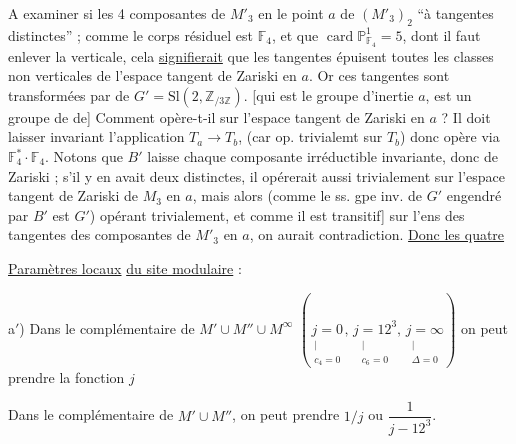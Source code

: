 A examiner si les  4 composantes de $M'_3$ en le point $a$ de $(M'_3)_2$  ``à tangentes distinctes'' ; comme le corps résiduel est $\mathbb F_4$, et que $\operatorname{card}\mathbb P^1_{\mathbb F_4}=5$, dont il faut enlever la verticale, cela \uline{signifierait} que les tangentes épuisent toutes les classes non verticales de l'espace tangent de Zariski en $a$. Or ces tangentes sont transformées  par  de $G'=\mathrm{Sl}(2,\mathbb Z_{/3\mathbb Z})$. [qui est le  groupe d'inertie  $a$, est un groupe de   de]  Comment opère-t-il sur l'espace tangent de Zariski  en $a$ ?  Il doit laisser invariant l'application $T_a\to T_b$,  (car op. trivialemt sur $T_b$) donc opère via $\mathbb F_4^*\cdot\mathbb F_4$.
Notons que $B'$  laisse chaque composante irréductible invariante, donc     de Zariski ;  s'il y en avait deux distinctes, il opérerait aussi trivialement sur l'espace tangent de Zariski de $M_3$ en $a$, mais alors (comme le ss. gpe inv. de $G'$ engendré par $B'$ est $G'$)   opérant trivialement, et comme il est transitif] sur l'ens des tangentes des composantes de $M'_3$ en $a$, on aurait contradiction. \uline{Donc les quatre}

\uline{Paramètres locaux} \uline{du site modulaire} :

a$'$) Dans le complémentaire de $M'\cup M''\cup M^\infty$ $\left(\underset{\substack{|\\c_4=0}}{j=0},\,\underset{\substack{|\\c_6=0}}{j=12^3},\,\underset{\substack{|\\\Delta=0}}{j=\infty}\right)$   on peut prendre la fonction $j$

 Dans le complémentaire de $M'\cup M''$, on peut prendre $1/j$ ou $\dfrac{1}{j-12^3}$.

